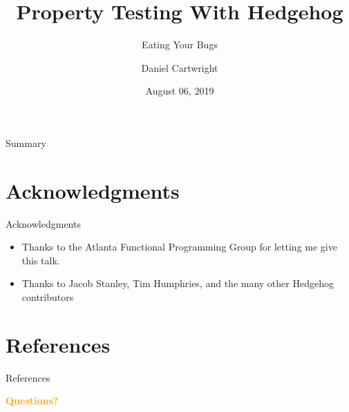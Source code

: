 \documentclass[aspectratio=43]{beamer}
\title{Property Testing With Hedgehog}
\subtitle{Eating Your Bugs}
\author[]{Daniel Cartwright}
\institute[Atlanta Functional Programming]{
    Atlanta Functional Programming
}
\date{August 06, 2019}
\begin{document}
    
    \frame{\titlepage}
    
    \begin{frame}{Summary}
        \tableofcontents
    \end{frame}

    
    
    
    
    
   
   
    
    \section*{Acknowledgments}
        \begin{frame}{Acknowledgments}
            \begin{itemize}
                \item Thanks to the Atlanta Functional Programming Group for letting me give this talk.
                \item Thanks to Jacob Stanley, Tim Humphries, and the many other Hedgehog contributors
            \end{itemize}
        \end{frame}
    
    \section*{References}
        \begin{frame}{References}
            \nocite{FPComplete} \nocite{Humphries}
            \printbibliography
        \end{frame}

    \begin{frame}{}
        \centering
            \Huge\bfseries
        \textcolor{orange}{Questions?}
    \end{frame}
\end{document}
